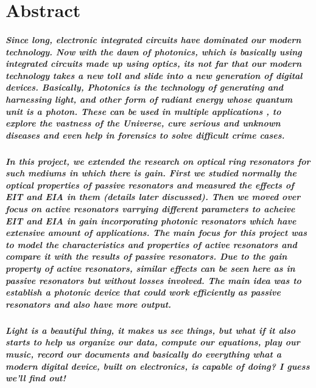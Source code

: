 \documentclass[12pt,twoside]{report}
\begin{document}
\chapter*{{\Large Abstract}}
\paragraph{ \normalfont Since long, electronic integrated circuits have dominated our modern technology. Now with the dawn of photonics, which is basically using integrated circuits made up using optics, its not far that our modern technology takes a new toll and slide into a new generation of digital devices. Basically, Photonics is the technology of generating and harnessing light, and other form of radiant energy whose quantum unit is a photon. These can be used in multiple applications , to explore the vastness of the Universe, cure serious and unknown diseases and even help in forensics to solve difficult crime cases.}  

\paragraph{\normalfont In this project, we extended the research on optical ring resonators for such mediums in which there is gain. First we studied normally the optical properties of passive resonators and measured the effects of EIT and EIA in them (details later discussed). Then we moved over focus on active resonators varrying different parameters to acheive EIT and EIA in gain incorporating photonic resonators which have extensive amount of applications. The main focus for this project was to model the characteristics and properties of active resonators and compare it with the results of passive resonators. Due to the gain property of active resonators, similar effects can be seen here as in passive resonators but without losses involved. The main idea was to establish a photonic device that could work efficiently as passive resonators and also have more output. }

\paragraph{\normalfont Light is a beautiful thing, it makes us see things, but what if it also starts to help us organize our data, compute our equations, play our music, record our documents and basically do everything what a modern digital device, built on electronics, is capable of doing? I guess  we’ll find out!}
\end{document}
